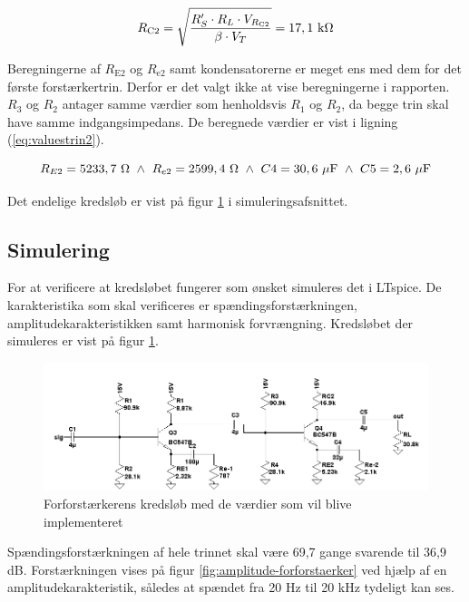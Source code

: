 \begin{equation}
R_{\mathrm{C2}} = \sqrt{\frac{R'_S \cdot R_L \cdot V_{R_\mathrm{C2}}}{\beta \cdot V_T}} = 17,1~\mathrm{k}\ohm
\label{eq:rc2maks}
\end{equation}

Beregningerne af $R_{\mathrm{E2}}$ og $R_{\mathrm{e2}}$ samt kondensatorerne er meget ens med dem for det første forstærkertrin. Derfor er det valgt ikke at vise beregningerne i rapporten. $R_3$ og $R_2$ antager samme værdier som henholdsvis $R_1$ og $R_2$, da begge trin skal have samme indgangsimpedans. De beregnede værdier er vist i ligning (\ref{eq:valuestrin2}).

\begin{equation}
R_{E2}=5233,7~\ohm ~ \wedge ~R_{e2}=2599,4~\ohm ~ \wedge ~ C4=30,6~\mathrm{\mu F} ~ \wedge ~ C5=2,6~\mathrm{\mu F}
\label{eq:valuestrin2}
\end{equation}

Det endelige kredsløb er vist på figur \ref{fig:forforstaerkersimuleringkredslob} i simuleringsafsnittet.

\subsection*{Simulering}

For at verificere at kredsløbet fungerer som ønsket simuleres det i LTspice. De karakteristika som skal verificeres er spændingsforstærkningen, amplitudekarakteristikken samt harmonisk forvrængning. Kredsløbet der simuleres er vist på figur \ref{fig:forforstaerkersimuleringkredslob}. 

\begin{figure}[h]
\centering
\includegraphics[width=\textwidth]{teknisk/forforstaerker/forforstaerkerendeligkreds.png}
\caption{Forforstærkerens kredsløb med de værdier som vil blive implementeret}
\label{fig:forforstaerkersimuleringkredslob}
\end{figure}

Spændingsforstærkningen af hele trinnet skal være 69,7 gange svarende til 36,9 dB. Forstærkningen vises på figur \ref{fig:amplitude-forforstaerker} ved hjælp af en amplitudekarakteristik, således at spændet fra 20 Hz til 20 kHz tydeligt kan ses. 


